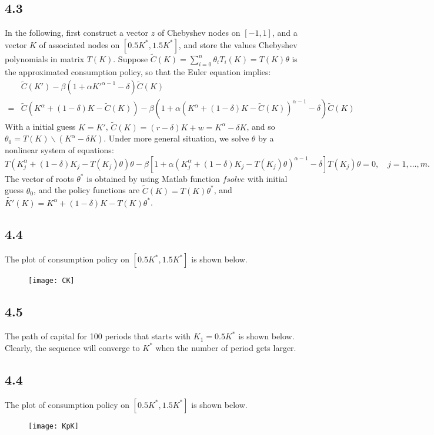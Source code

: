\documentclass[11pt]{article}
\newcommand{\alp}{\ensuremath{\alpha}}
\newcommand{\bet}{\ensuremath{\beta}}
\newcommand{\tht}{\ensuremath{\theta}}
\begin{document}
\subsection*{4.3}
In the following, first construct a vector $z$ of Chebyshev nodes on $[-1,1]$, and a vector $K$ of associated nodes on $[0.5K^*, 1.5K^*]$, and store the values Chebyshev polynomials in matrix $T(K)$. Suppose $\tilde{C}(K) = \sum_{i=0}^n \tht_i T_i(K) = T(K) \tht$ is the approximated consumption policy, so that the Euler equation implies:
\begin{align*}
& \tilde{C}(K') - \bet (1 + \alp K'^{\alp-1} - \delta) \tilde{C}(K) \\
= & \tilde{C}(K^\alp + (1 - \delta) K - \tilde{C}(K)) - \bet (1 + \alp (K^\alp + (1 - \delta) K - \tilde{C}(K))^{\alp-1} - \delta) \tilde{C}(K)
\end{align*}
With a initial guess $K = K'$, $\tilde{C}(K) = (r - \delta)K + w = K^\alp - \delta K$, and so $\tht_0 = T(K) \backslash (K^\alp - \delta K)$. Under more general situation, we solve $\tht$ by a nonlinear system of equations:$$ T(K_j^\alp + (1-\delta) K_j - T(K_j) \tht) \tht - \bet [1 + \alp (K_j^\alp + (1 - \delta) K_j - T(K_j) \tht )^{\alp-1} - \delta] T(K_j) \tht = 0, \quad j = 1, \ldots, m.$$ The vector of roots $\tht^*$ is obtained by using Matlab function $fsolve$ with initial guess $\tht_0$, and the policy functions are $\tilde{C}(K) = T(K)\tht^*$, and $\tilde{K'}(K) = K^\alp + (1-\delta) K - T(K)\tht^*$.

\subsection*{4.4}
The plot of consumption policy on $[0.5K^*, 1.5K^*]$ is shown below.
\begin{figure}[h!]
\centering
\texttt{[image: CK]}
\end{figure}

\subsection*{4.5}
The path of capital for 100 periods that starts with $K_1 = 0.5 K^*$ is shown below. Clearly, the sequence will converge to $K^*$ when the number of period gets larger.
\subsection*{4.4}
The plot of consumption policy on $[0.5K^*, 1.5K^*]$ is shown below.
\begin{figure}[h!]
\centering
\texttt{[image: KpK]}
\end{figure}
\end{document}
